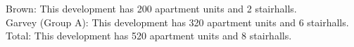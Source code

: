 {Brown}: This development has 200 apartment units and 2 stairhalls.\\{Garvey (Group A)}: This development has 320 apartment units and 6 stairhalls.\\{Total}: This development has 520 apartment units and 8 stairhalls.\\